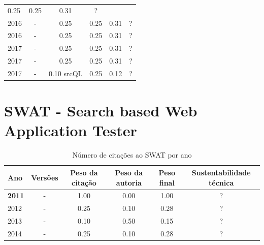 \begin{table}[H]
\begin{tabular}{| l | c | c | c | c | c |}
          0.25
          &
          0.25
          &
            {\color{red} 0.31}
          &
          ?
          \\
            2016
          &
          -
          &
          0.25
          &
          0.25
          &
            {\color{red} 0.31}
          &
          ?
          \\
            2016
          &
          -
          &
          0.25
          &
          0.25
          &
            {\color{red} 0.31}
          &
          ?
          \\
\hline
            2017
          &
          -
          &
          0.25
          &
          0.25
          &
            {\color{red} 0.31}
          &
          ?
          \\
            2017
          &
          -
          &
          0.25
          &
          0.25
          &
            {\color{red} 0.31}
          &
          ?
          \\
            2017
          &
          -
          &
          0.10
            {\tiny srcQL}
          &
          0.25
          &
            {\color{red} 0.12}
          &
          ?
          \\
\hline
\end{tabular}
\end{table}



\section{SWAT - Search based Web Application Tester}



\begin{table}[H]
\caption{Número de citações ao SWAT  por ano}
\centering
\begin{tabular}{| l | c | c | c | c | c |}
  \hline
  Ano & Versões & Peso da citação & Peso da autoria & Peso final & Sustentabilidade técnica \\
  \hline
            {\bf 2011}
          &
          -
          &
          1.00
          &
          0.00
          &
            {\color{blue} 1.00}
          &
          ?
          \\
\hline
            2012
          &
          -
          &
          0.25
          &
          0.10
          &
            {\color{red} 0.28}
          &
          ?
          \\
\hline
            2013
          &
          -
          &
          0.10
          &
          0.50
          &
            {\color{red} 0.15}
          &
          ?
          \\
\hline
            2014
          &
          -
          &
          0.25
          &
          0.10
          &
            {\color{red} 0.28}
          &
          ?
          \\
\hline
\end{tabular}
\end{table}



